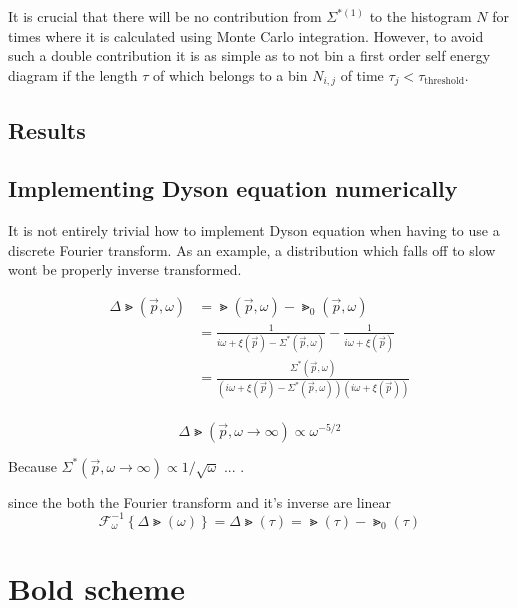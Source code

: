 It is crucial that there will be no contribution from $ \Sigma^{*(1)} $ to the histogram $ N $ for times where it is calculated using Monte Carlo integration. However, to avoid such a double contribution it is as simple as to not bin a first order self energy diagram if the length $ \tau $ of which belongs to a bin $ N_{i,j} $ of time $ \tau_j < \tau_\text{threshold} $.

\subsection{Results}


\subsection{Implementing Dyson equation numerically}

It is not entirely trivial how to implement Dyson equation when having to use a discrete Fourier transform. As an example, a distribution which falls off to slow wont be properly inverse transformed.




\begin{equation}
	\begin{split}
		\Delta \Gt(\vec p, \omega)
		&= \Gt(\vec p, \omega) - \Gt_0(\vec p, \omega) \\
		&= \frac{1}{i \omega + \xi(\vec p) - \Sigma^*(\vec p, \omega)} - \frac{1}{i \omega + \xi(\vec p)} \\
		&= \frac{\Sigma^*(\vec p, \omega)}{\left( i \omega + \xi(\vec p) - \Sigma^*(\vec p, \omega) \right) \left( i \omega + \xi(\vec p) \right)} \\
	\end{split}
\end{equation}


\begin{equation}
	\Delta \Gt(\vec p, \omega \rightarrow \infty) \propto \omega^{-5/2}
\end{equation}

Because $ \Sigma^*(\vec p, \omega \rightarrow \infty) \propto 1/\sqrt \omega $ ... .


since the both the Fourier transform and it's inverse are linear
\begin{equation}
	\mathcal{F}^{-1}_{\omega} \left\{ \Delta \Gt(\omega) \right\} = \Delta \Gt(\tau) = \Gt(\tau) - \Gt_0(\tau)
\end{equation}







\section{Bold scheme }

